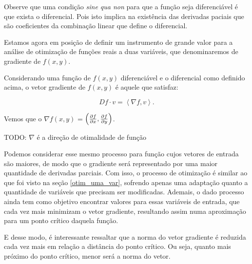 Observe que uma condição \textit{sine qua non} para que a função seja
diferenciável é que exista o diferencial. Pois isto implica na existência das
derivadas paciais que são coeficientes da combinação linear que define o
diferencial.

Estamos agora em posição de definir um instrumento de grande valor para a
análise de otimização de funções reais a duas variáveis, que denominaremos de
gradiente de $f(x, y)$.

\begin{definition}[Gradiente de $f(x, y)$]

    Considerando uma função de $f(x, y)$ diferenciável e o diferencial como
    definido acima, o vetor gradiente de $f(x, y)$ é aquele que satisfaz:

    \begin{equation}
        Df \cdot v = \left\langle \nabla f, v \right\rangle.
    \end{equation}

    Vemos que o $\nabla f(x, y)$ = $\left(\frac{\partial f}{\partial x}, \frac{\partial f}{\partial y}\right)$.


\end{definition}

    \begin{proposition}
        TODO: $\nabla$ é a direção de otimalidade de função
    \end{proposition}


Podemos considerar esse mesmo processo para função cujos vetores de entrada são
maiores, de modo que o gradiente será representado por uma maior quantidade de
derivadas parciais. Com isso, o processo de otimização é similar ao que foi
visto na seção \ref{otim_uma_var}, sofrendo apenas uma adaptação quanto a
quantidade de variáveis que precisam ser modificadas. Ademais, o dado processo
ainda tem como objetivo encontrar valores para essas variáveis de entrada, que
cada vez mais minimizam o vetor gradiente, resultando assim numa aproximação
para um ponto crítico daquela função.

E desse modo, é interessante ressaltar que a norma do vetor gradiente é reduzida
cada vez mais em relação a distância do ponto crítico. Ou seja, quanto mais
próximo do ponto crítico, menor será a norma do vetor.

%
